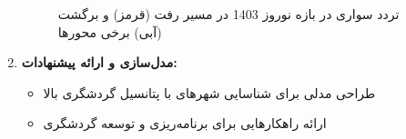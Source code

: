 \documentclass[a4paper, 12pt]{article}
\begin{document}
\begin{enumerate}
        \begin{figure}[htbp]
            \centering
            \caption{تردد سواری در بازه نوروز 1403 در مسیر رفت (قرمز) و برگشت (آبی) برخی محورها}
        \end{figure}


    \item \textbf{مدل‌سازی و ارائه پیشنهادات:}
        \begin{itemize}
            \item طراحی مدلی برای شناسایی شهرهای با پتانسیل گردشگری بالا
            \item ارائه راهکارهایی برای برنامه‌ریزی و توسعه گردشگری
        \end{itemize}
\end{enumerate}
\end{document}
